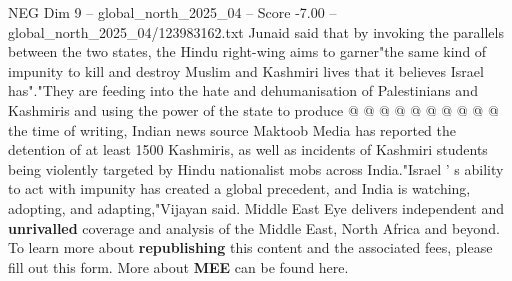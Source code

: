 \begin{textsample}{NEG Dim 9 – global\_north\_2025\_04 – Score -7.00 – global\_north\_2025\_04/123983162.txt}
Junaid said that by invoking the parallels between the two states, the Hindu right-wing aims to garner"the same kind of impunity to kill and destroy Muslim and Kashmiri lives that it believes Israel has"."They are feeding into the hate and dehumanisation of Palestinians and Kashmiris and using the power of the state to produce @ @ @ @ @ @ @ @ @ @ the time of writing, Indian news source Maktoob Media has reported the detention of at least 1500 Kashmiris, as well as incidents of Kashmiri students being violently targeted by Hindu nationalist mobs across India."Israel ' s ability to act with impunity has created a global precedent, and India is watching, adopting, and adapting,"Vijayan said.
Middle East Eye delivers independent and \textbf{unrivalled} coverage and analysis of the Middle East, North Africa and beyond.
To learn more about \textbf{republishing} this content and the associated fees, please fill out this form.
More about \textbf{MEE} can be found here.

\end{textsample}
